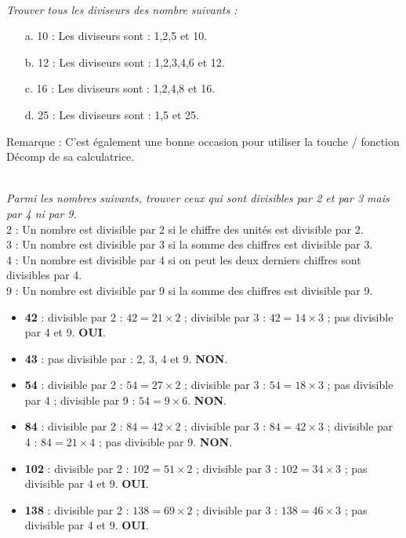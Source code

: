 \documentclass[11pt]{article}
\begin{document}
\\
\textit{Trouver tous les diviseurs des nombre suivants : }
\begin{multicols}{2}
\begin{enumerate}
    \item[a.] 10 : Les diviseurs sont : 1,2,5 et 10.
    \item[b.] 12 : Les diviseurs sont : 1,2,3,4,6 et 12.
    \item[c.] 16 : Les diviseurs sont : 1,2,4,8 et 16.
    \item[d.] 25 : Les diviseurs sont : 1,5 et 25.
\end{enumerate}
\end{multicols}
Remarque : C'est également une bonne occasion pour utiliser la touche / fonction Décomp de sa calculatrice. 

\\
\textit{Parmi les nombres suivants, trouver ceux qui sont divisibles par 2 et par 3 mais par 4 ni par 9.} \\
2 : Un nombre est divisible par 2 si le chiffre des unités est divisible par 2. \\
3 : Un nombre est divisible par 3 si la somme des chiffres est divisible par 3. \\
4 : Un nombre est divisible par 4 si on peut les deux derniers chiffres sont divisibles par 4. \\
9 : Un nombre est divisible par 9 si la somme des chiffres est divisible par 9. \\
\begin{multicols}{2}
\begin{itemize}
    \item \textbf{42} : divisible par 2 : $42 = 21 \times 2$ ; divisible par 3 : $42 = 14 \times 3$ ; pas divisible par 4 et 9. \textbf{OUI}.
    \item \textbf{43} : pas divisible par : 2, 3, 4 et 9. \textbf{NON}.
    \item \textbf{54} : divisible par 2 : $54 = 27 \times 2$ ; divisible par 3 : $54 = 18 \times 3$ ; pas divisible par 4 ; divisible par 9 : $54 = 9 \times 6$. \textbf{NON}. \columnbreak
    \item \textbf{84} : divisible par 2 : $84 = 42 \times 2$ ; divisible par 3 : $84 = 42 \times 3$ ; divisible par 4 : $84 = 21 \times 4$ ; pas divisible par 9. \textbf{NON}.
    \item \textbf{102} : divisible par 2 : $102 = 51 \times 2$ ; divisible par 3 : $102 = 34 \times 3$ ; pas divisible par 4 et 9. \textbf{OUI}.
    \item \textbf{138} : divisible par 2 : $138 = 69 \times 2$ ; divisible par 3 : $138 = 46 \times 3$ ; pas divisible par 4 et 9. \textbf{OUI}.
\end{itemize}
\end{multicols}
\end{document}
